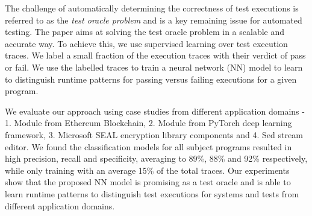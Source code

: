 

The challenge of automatically determining the correctness of test executions is referred to as the \emph{test oracle problem} and is a
key remaining issue for automated testing.
The paper aims at solving the test oracle problem in a scalable and accurate way. 
To achieve this, we use supervised learning over test execution traces. We label a small fraction of the execution traces with their verdict of pass or fail. 
We use the labelled traces to train a neural network (NN) model to learn to distinguish runtime patterns for passing versus failing executions for a given program. 

We evaluate our approach using case studies from different application domains - 1. Module from Ethereum Blockchain, 2. Module from PyTorch deep learning framework, 3. Microsoft SEAL encryption library components and 4. Sed stream editor. We found the classification models for all subject programs resulted in high precision, recall and specificity, averaging to 89\%, 88\% and 92\% respectively, while only training with an average 15\% of the total traces. Our experiments show that the proposed NN model is promising as a test oracle and is able to learn runtime patterns to distinguish test executions for systems and tests from different application domains. 

